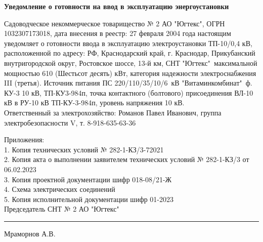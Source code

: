 \vspace{8mm}
\begin{center}
	\Large\textbf{ Уведомление о готовности на ввод в эксплуатацию  энергоустановки}
\end{center}
\par
\vspace{10mm}

Садоводческое некоммерческое товарищество № 2 АО "Югтекс", ОГРН 1032307173018, дата внесения в реестр: 27 февраля 2004 года настоящим уведомляет о  готовности ввода в эксплуатацию   электроустановки ТП-10/0,4 кВ,  расположенной по адресу: РФ, Краснодарский край, г. Краснодар, Прикубанский внутригородской округ, Ростовское шоссе, 13-й км, СНТ "Югтекс"\ максимальной мощностью 610 (Шестьсот десять) кВт, категория надежности электроснабжения III (третья). Источник питания ПС 220/110/35/10/6~кВ "Витаминкомбинат"\ ф. КУ-3 10 кВ, ТП-КУ3-984п, точка контактного (болтового) присоединения ВЛ-10 кВ в РУ-10 кВ ТП-КУ-3-984п, уровень напряжения 10 кВ.\\

Ответственный за электрохозяйство: Романов Павел Иванович, группа электробезопасности V, т. 8-918-635-63-36





\vspace{5mm}

\noindent Приложения:\\
1. Копия технических условий  № 282-1-КЗ/3-72021\\
2. Копия акта о выполнении заявителем технических условий № 282-1-КЗ/3 от 06.02.2023\\
3. Копия проектной документации шифр 018-08/21-Ж\\
4. Схема электрических соединений\\
5. Копия исполнительной документации шифр 01-2023\\



\vspace{15mm}
\noindent Председатель СНТ № 2 АО "Югтекс" \hfill    \rule{3cm}{0.1 mm}    Мраморнов А.В.




